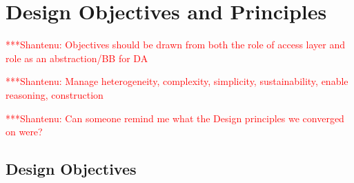 \documentclass[a4paper,10pt]{article}
\newcommand{\jhanote}[1]{  {\textcolor{red}  { ***Shantenu: #1 }}}
\newcommand{\jhanote}[1]{}
\begin{document}
\section{Design Objectives and Principles}\label{saga_impls}


 \jhanote{Objectives should be drawn from both the role of access
   layer and role as an abstraction/BB for DA}

 \jhanote{Manage heterogeneity, complexity, simplicity,
   sustainability, enable reasoning, construction}

 \jhanote{Can someone remind me what the Design principles we
   converged on were?}

 \subsection{Design Objectives}
\end{document}
